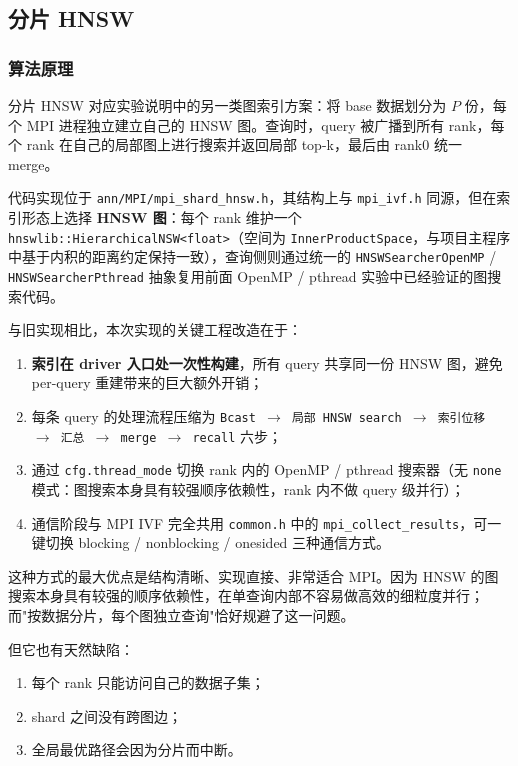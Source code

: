 \documentclass[a4paper]{article}
\begin{document}
\subsection{分片 HNSW}

\subsubsection{算法原理}

分片 HNSW 对应实验说明中的另一类图索引方案：将 base 数据划分为 $P$ 份，每个 MPI 进程独立建立自己的 HNSW 图。查询时，query 被广播到所有 rank，每个 rank 在自己的局部图上进行搜索并返回局部 top-k，最后由 rank0 统一 merge。

代码实现位于 \texttt{ann/MPI/mpi\_shard\_hnsw.h}，其结构上与 \texttt{mpi\_ivf.h} 同源，但在索引形态上选择 \textbf{HNSW 图}：每个 rank 维护一个 \texttt{hnswlib::HierarchicalNSW<float>}（空间为 \texttt{InnerProductSpace}，与项目主程序中基于内积的距离约定保持一致），查询侧则通过统一的 \texttt{HNSWSearcherOpenMP} / \texttt{HNSWSearcherPthread} 抽象复用前面 OpenMP / pthread 实验中已经验证的图搜索代码。

与旧实现相比，本次实现的关键工程改造在于：
\begin{enumerate}
    \item \textbf{索引在 driver 入口处一次性构建}，所有 query 共享同一份 HNSW 图，避免 per-query 重建带来的巨大额外开销；
    \item 每条 query 的处理流程压缩为 \texttt{Bcast $\rightarrow$ 局部 HNSW search $\rightarrow$ 索引位移 $\rightarrow$ 汇总 $\rightarrow$ merge $\rightarrow$ recall} 六步；
    \item 通过 \texttt{cfg.thread\_mode} 切换 rank 内的 OpenMP / pthread 搜索器（无 \texttt{none} 模式：图搜索本身具有较强顺序依赖性，rank 内不做 query 级并行）；
    \item 通信阶段与 MPI IVF 完全共用 \texttt{common.h} 中的 \texttt{mpi\_collect\_results}，可一键切换 blocking / nonblocking / onesided 三种通信方式。
\end{enumerate}

这种方式的最大优点是结构清晰、实现直接、非常适合 MPI。因为 HNSW 的图搜索本身具有较强的顺序依赖性，在单查询内部不容易做高效的细粒度并行；而"按数据分片，每个图独立查询"恰好规避了这一问题。

但它也有天然缺陷：
\begin{enumerate}
    \item 每个 rank 只能访问自己的数据子集；
    \item shard 之间没有跨图边；
    \item 全局最优路径会因为分片而中断。
\end{enumerate}
\end{document}
